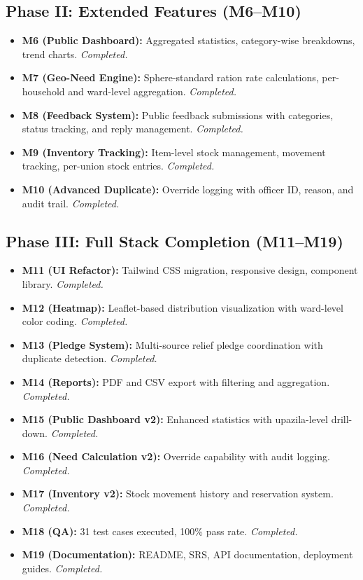 \subsection*{Phase II: Extended Features (M6--M10)}
\begin{itemize}[leftmargin=1.2cm]
    \item \textbf{M6 (Public Dashboard):} Aggregated statistics, category-wise breakdowns, trend charts. \textit{Completed.}
    \item \textbf{M7 (Geo-Need Engine):} Sphere-standard ration rate calculations, per-household and ward-level aggregation. \textit{Completed.}
    \item \textbf{M8 (Feedback System):} Public feedback submissions with categories, status tracking, and reply management. \textit{Completed.}
    \item \textbf{M9 (Inventory Tracking):} Item-level stock management, movement tracking, per-union stock entries. \textit{Completed.}
    \item \textbf{M10 (Advanced Duplicate):} Override logging with officer ID, reason, and audit trail. \textit{Completed.}
\end{itemize}

\subsection*{Phase III: Full Stack Completion (M11--M19)}
\begin{itemize}[leftmargin=1.2cm]
    \item \textbf{M11 (UI Refactor):} Tailwind CSS migration, responsive design, component library. \textit{Completed.}
    \item \textbf{M12 (Heatmap):} Leaflet-based distribution visualization with ward-level color coding. \textit{Completed.}
    \item \textbf{M13 (Pledge System):} Multi-source relief pledge coordination with duplicate detection. \textit{Completed.}
    \item \textbf{M14 (Reports):} PDF and CSV export with filtering and aggregation. \textit{Completed.}
    \item \textbf{M15 (Public Dashboard v2):} Enhanced statistics with upazila-level drill-down. \textit{Completed.}
    \item \textbf{M16 (Need Calculation v2):} Override capability with audit logging. \textit{Completed.}
    \item \textbf{M17 (Inventory v2):} Stock movement history and reservation system. \textit{Completed.}
    \item \textbf{M18 (QA):} 31 test cases executed, 100\% pass rate. \textit{Completed.}
    \item \textbf{M19 (Documentation):} README, SRS, API documentation, deployment guides. \textit{Completed.}
\end{itemize}

